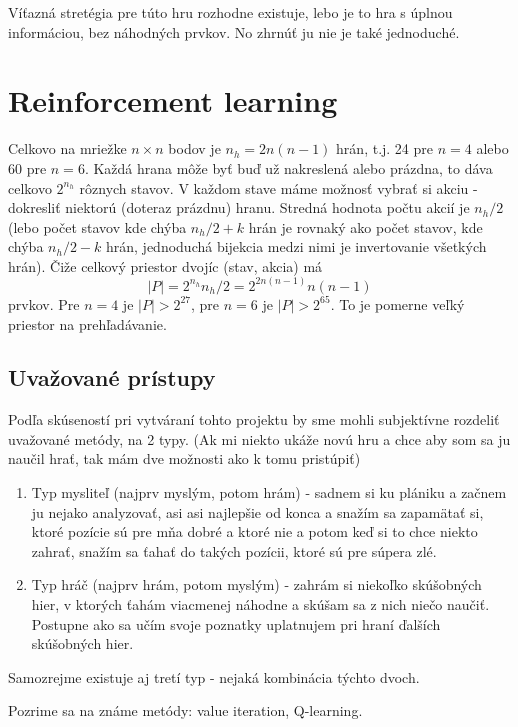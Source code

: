 \documentclass[10pt,a4paper]{article}
\begin{document}
Víťazná stretégia pre túto hru rozhodne existuje, lebo je to hra s úplnou informáciou, bez náhodných prvkov. 
No zhrnúť ju nie je také jednoduché. 



\section{Reinforcement learning}


Celkovo na mriežke $n\times n$ bodov je $n_h = 2n(n-1)$ hrán, t.j. 24 pre $n=4$ 
alebo 60 pre $n=6$. Každá hrana môže byť buď už nakreslená alebo prázdna, to dáva
celkovo $2^{n_h}$ rôznych stavov. V každom stave máme možnosť vybrať si akciu - dokresliť 
niektorú (doteraz prázdnu) hranu. Stredná hodnota počtu akcií je $n_h/2$ 
(lebo počet stavov kde chýba $n_h/2 + k$ hrán je rovnaký ako počet stavov, kde chýba $n_h/2 -k$ hrán, 
jednoduchá bijekcia medzi nimi je invertovanie všetkých hrán).
Čiže celkový priestor dvojíc (stav, akcia) má $$|P| = 2^{n_h}n_h/2 = 2^{2n(n-1)}n(n-1)$$
prvkov. Pre $n=4$ je $|P| > 2^{27}$, pre $n=6$ je $|P| > 2^{65}$.
To je pomerne veľký priestor na prehľadávanie.




\subsection{Uvažované prístupy}


Podľa skúseností pri vytváraní tohto projektu by sme mohli subjektívne rozdeliť uvažované metódy, na 2 typy. 
(Ak mi niekto ukáže novú hru a chce aby som sa ju naučil hrať, tak mám dve možnosti ako k tomu pristúpiť)
\begin{enumerate}
\item Typ mysliteľ (najprv myslým, potom hrám) - sadnem si ku plániku a začnem ju nejako analyzovať, asi 
	asi najlepšie od konca a snažím sa zapamätať si, ktoré pozície sú pre mňa dobré a ktoré nie a potom keď si
	to chce niekto zahrať, snažím sa ťahať do takých pozícii, ktoré sú pre súpera zlé.
\item Typ hráč (najprv hrám, potom myslým) - zahrám si niekoľko skúšobných hier, v ktorých ťahám viacmenej náhodne
	a skúšam sa z nich niečo naučiť. Postupne ako sa učím svoje poznatky uplatnujem pri hraní ďalších skúšobných hier.
\end{enumerate}

Samozrejme existuje aj tretí typ - nejaká kombinácia týchto dvoch.


Pozrime sa na známe metódy: value iteration, Q-learning.
\end{document}
